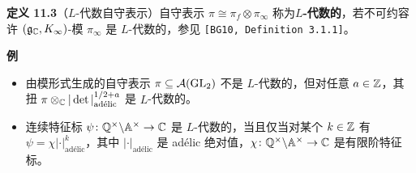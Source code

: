 \medskip
\noindent\textbf{定义 11.3}（$L$-代数自守表示）\label{def:11.3}\quad 自守表示 $\pi\cong\pi_f\otimes\pi_\infty$ 称为\textbf{$L$-代数的}，若不可约容许 $(\mathfrak{g}_{\mathbb{C}},K_\infty)$-模 $\pi_\infty$ 是 $L$-代数的，参见 \texttt{[BG10, Definition 3.1.1]}。

\medskip
\noindent\textbf{例}
\begin{itemize}
\item 由模形式生成的自守表示 $\pi\subseteq\mathcal{A}(\operatorname{GL}_2)$ 不是 $L$-代数的，但对任意 $a\in\mathbb{Z}$，其扭 $\pi\otimes_{\mathbb{C}}|\det|^{1/2+a}_{\text{adélic}}$ 是 $L$-代数的。
\item 连续特征标 $\psi\colon\mathbb{Q}^\times\backslash\mathbb{A}^\times\to\mathbb{C}$ 是 $L$-代数的，当且仅当对某个 $k\in\mathbb{Z}$ 有 $\psi=\chi|\cdot|^k_{\text{adélic}}$，其中 $|\cdot|_{\text{adélic}}$ 是 adélic 绝对值，$\chi\colon\mathbb{Q}^\times\backslash\mathbb{A}^\times\to\mathbb{C}$ 是有限阶特征标。
\end{itemize}
